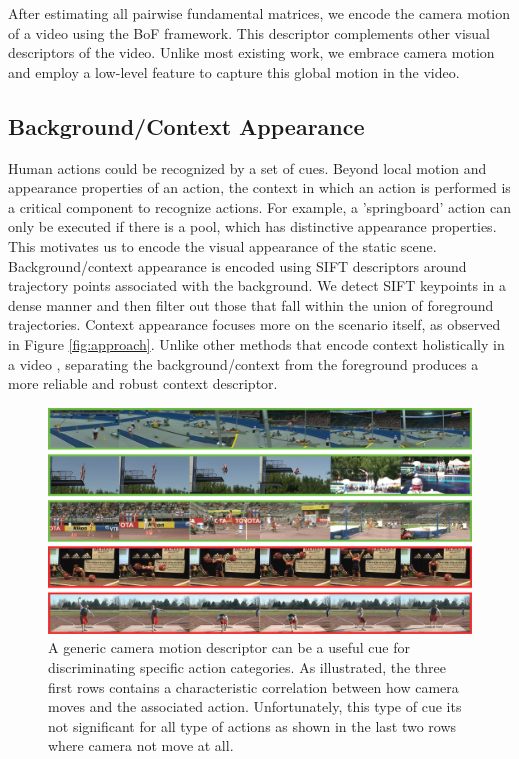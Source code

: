 After estimating all pairwise fundamental matrices, we encode the camera motion of a video using the BoF framework. This descriptor complements other visual descriptors of the video. Unlike most existing work, we embrace camera motion and employ a low-level feature to capture this global motion in the video.


\subsection{Background/Context Appearance}
Human actions could be recognized by a set of cues. Beyond local motion and appearance properties of an action, the context in which an action is performed is a critical component to recognize actions. For example, a 'springboard' action can only be executed if there is a pool, which has distinctive appearance properties. This motivates us to encode the visual appearance of the static scene. Background/context appearance is encoded using SIFT descriptors \cite{lowe2004} around trajectory points associated with the background. We detect SIFT keypoints in a dense manner and then filter out those that fall within the union of foreground trajectories. Context appearance focuses more on the scenario itself, as observed in Figure \ref{fig:approach}.  Unlike other methods that encode context holistically in a video \cite{marszalek2009}, separating the background/context from the foreground produces a more reliable and robust context descriptor.

\begin{figure}[t!]
\begin{center}
\includegraphics[width=0.98\linewidth]{fig/camMotion.png}
\end{center}
\caption{A generic camera motion descriptor can be a useful cue for discriminating specific action categories. As illustrated, the three first rows contains a characteristic correlation between how camera moves and the associated action. Unfortunately, this type of cue its not significant for all type of actions as shown in the last two rows where camera not move at all.}
\label{fig:camMotion_example}
\end{figure}

